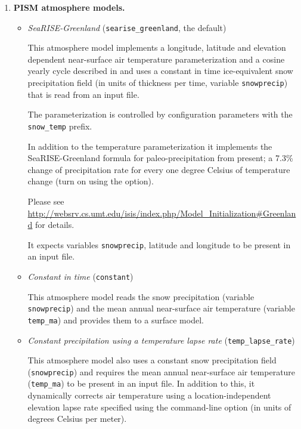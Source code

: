 \begin{enumerate}
\item \textbf{PISM atmosphere models.}
\begin{itemize}
  \item \emph{SeaRISE-Greenland} (\texttt{searise_greenland}, the default)

    This atmosphere model implements a longitude, latitude and elevation dependent near-surface air temperature parameterization and a cosine yearly cycle described in \cite{Faustoetal2009} and uses a constant in time ice-equivalent snow precipitation field (in units of thickness per time, variable \texttt{snowprecip}) that is read from an input file.

    The parameterization is controlled by configuration parameters with the \texttt{snow_temp} prefix.

    In addition to the temperature parameterization it implements the SeaRISE-Greenland formula for paleo-precipitation from present; a 7.3\% change of precipitation rate for every one degree Celsius of temperature change \cite{Huybrechts02} (turn on using the  option).

    Please see \url{http://websrv.cs.umt.edu/isis/index.php/Model_Initialization#Greenland} for details.

    It expects variables \texttt{snowprecip}, latitude and longitude to be present in an input file.

 \item \emph{Constant in time} (\texttt{constant})

    This atmosphere model reads the snow precipitation (variable \texttt{snowprecip}) and the mean annual near-surface air temperature (variable \texttt{temp_ma}) and provides them to a surface model.
  \item \emph{Constant precipitation using a temperature lapse rate} (\texttt{temp_lapse_rate})
    
    This atmosphere model also uses a constant snow precipitation field (\texttt{snowprecip}) and requires the mean annual near-surface air temperature (\texttt{temp_ma}) to be present in an input file. In addition to this, it dynamically corrects air temperature using a location-independent elevation lapse rate specified using the  command-line option (in units of degrees Celsius per meter).
 \end{itemize}


\end{enumerate}
